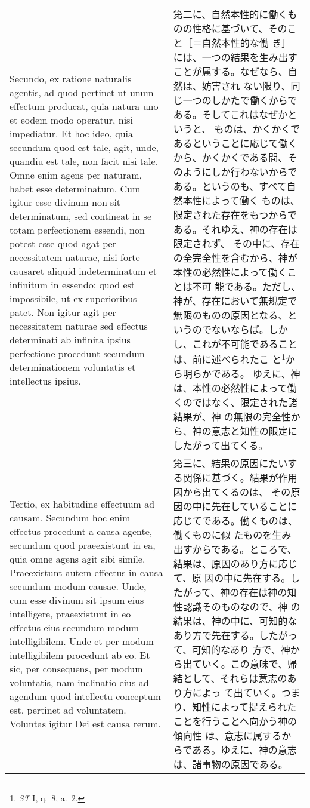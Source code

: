 \documentclass[10pt]{jsarticle} %
\begin{document}
\begin{longtable}{p{21em}p{21em}}
 
 \\

 Secundo, ex ratione naturalis
 agentis, ad quod pertinet ut unum effectum producat, quia natura uno et
 eodem modo operatur, nisi impediatur. Et hoc ideo, quia secundum quod
 est tale, agit, unde, quandiu est tale, non facit nisi tale. Omne enim
 agens per naturam, habet esse determinatum. Cum igitur esse divinum non
 sit determinatum, sed contineat in se totam perfectionem essendi, non
 potest esse quod agat per necessitatem naturae, nisi forte causaret
 aliquid indeterminatum et infinitum in essendo; quod est impossibile,
 ut ex superioribus patet. Non igitur agit per necessitatem naturae sed
 effectus determinati ab infinita ipsius perfectione procedunt secundum
 determinationem voluntatis et intellectus ipsius.

&

第二に、自然本性的に働くものの性格に基づいて、そのこと［＝自然本性的な働
 き］には、一つの結果を生み出すことが属する。なぜなら、自然は、妨害され
 ない限り、同じ一つのしかたで働くからである。そしてこれはなぜかというと、
 ものは、かくかくであるということに応じて働くから、かくかくである間、そ
 のようにしか行わないからである。というのも、すべて自然本性によって働く
 ものは、限定された存在をもつからである。それゆえ、神の存在は限定されず、
 その中に、存在の全完全性を含むから、神が本性の必然性によって働くことは不可
 能である。ただし、神が、存在において無規定で無限のものの原因となる、と
 いうのでないならば。しかし、これが不可能であることは、前に述べられたこ
 と\footnote{{\itshape ST} I, q.~8, a.~2.}から明らかである。
 ゆえに、神は、本性の必然性によって働くのではなく、限定された諸結果が、神
 の無限の完全性から、神の意志と知性の限定にしたがって出てくる。

 \\
 
 Tertio, ex habitudine
 effectuum ad causam. Secundum hoc enim effectus procedunt a causa
 agente, secundum quod praeexistunt in ea, quia omne agens agit sibi
 simile. Praeexistunt autem effectus in causa secundum modum
 causae. Unde, cum esse divinum sit ipsum eius intelligere, praeexistunt
 in eo effectus eius secundum modum intelligibilem. Unde et per modum
 intelligibilem procedunt ab eo. Et sic, per consequens, per modum
 voluntatis, nam inclinatio eius ad agendum quod intellectu conceptum
 est, pertinet ad voluntatem. Voluntas igitur Dei est causa rerum.

 
&

第三に、結果の原因にたいする関係に基づく。結果が作用因から出てくるのは、
 その原因の中に先在していることに応じてである。働くものは、働くものに似
 たものを生み出すからである。ところで、結果は、原因のあり方に応じて、原
 因の中に先在する。したがって、神の存在は神の知性認識そのものなので、神
 の結果は、神の中に、可知的なあり方で先在する。したがって、可知的なあり
 方で、神から出ていく。この意味で、帰結として、それらは意志のあり方によっ
 て出ていく。つまり、知性によって捉えられたことを行うことへ向かう神の傾向性
 は、意志に属するからである。ゆえに、神の意志は、諸事物の原因である。



\end{longtable}
\end{document}
